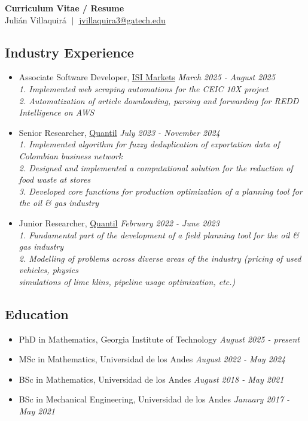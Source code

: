 \documentclass{article}
\begin{document}
\vspace{-6em}
\begin{center}
{\LARGE\textbf{Curriculum Vitae / Resume}}\\[5pt]
{\Large Juli\'an Villaquir\'a $\;\vert\;$ \href{mailto:jvillaquira3@gatech.edu}{\textcolor{myblue}{jvillaquira3@gatech.edu}}}
\end{center}

\subsection*{Industry Experience}
\begin{itemize}
\item Associate Software Developer, \href{https://www.isimarkets.com/}{\textcolor{myblue}{ISI Markets}} \hfill {\em March 2025 - August 2025}\\
\textit{1. Implemented web scraping automations for the CEIC 10X project}\\
\textit{2. Automatization of article downloading, parsing and forwarding for REDD Intelligence on AWS}
\item Senior Researcher, \href{https://quantil.co/en/}{\textcolor{myblue}{Quantil}} \hfill {\em July 2023 - November 2024}\\
\textit{1. Implemented algorithm for fuzzy deduplication of exportation data of Colombian business network}\\
\textit{2. Designed and implemented a computational solution for the reduction of food waste at stores}\\
\textit{3. Developed core functions for production optimization of a planning tool for the oil \& gas industry}
\item Junior Researcher, \href{https://quantil.co/en/}{Quantil} \hfill {\em February 2022 - June 2023}\\
\textit{1. Fundamental part of the development of a field planning tool for the oil \& gas industry}\\
\textit{2. Modelling of problems across diverse areas of the industry (pricing of used vehicles, physics\\
\phantom{2. }simulations of lime klins, pipeline usage optimization, etc.)}
\end{itemize}
\subsection*{Education}
\begin{itemize}
\item PhD in Mathematics, Georgia Institute of Technology \hfill {\em August 2025 - present}
\item MSc in Mathematics, Universidad de los Andes \hfill {\em August 2022 - May 2024}
\item BSc in Mathematics, Universidad de los Andes \hfill {\em August 2018 - May 2021}
\item BSc in Mechanical Engineering, Universidad de los Andes \hfill {\em January 2017 - May 2021}
\end{itemize}
\end{document}
